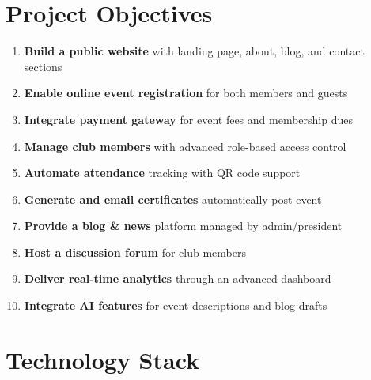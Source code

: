 \documentclass[12pt,a4paper]{article}
\begin{document}
\section{Project Objectives}

\begin{enumerate}[leftmargin=*, itemsep=5pt]
  \item \textbf{Build a public website} with landing page, about, blog, and contact sections
  \item \textbf{Enable online event registration} for both members and guests
  \item \textbf{Integrate payment gateway} for event fees and membership dues
  \item \textbf{Manage club members} with advanced role-based access control
  \item \textbf{Automate attendance} tracking with QR code support
  \item \textbf{Generate and email certificates} automatically post-event
  \item \textbf{Provide a blog \& news} platform managed by admin/president
  \item \textbf{Host a discussion forum} for club members
  \item \textbf{Deliver real-time analytics} through an advanced dashboard
  \item \textbf{Integrate AI features} for event descriptions and blog drafts
\end{enumerate}

\section{Technology Stack}
\end{document}
